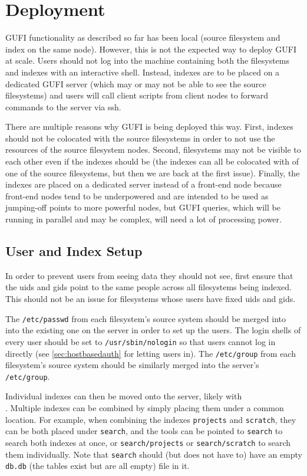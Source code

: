 \section{Deployment}
\label{sec:deploy}
GUFI functionality as described so far has been local (source
filesystem and index on the same node). However, this is not the
expected way to deploy GUFI at scale. Users should not log into the
machine containing both the filesystems and indexes with an
interactive shell. Instead, indexes are to be placed on a dedicated
GUFI server (which may or may not be able to see the source
filesystems) and users will call client scripts from client nodes to
forward commands to the server via ssh.

There are multiple reasons why GUFI is being deployed this way. First,
indexes should not be colocated with the source filesystems in order
to not use the resources of the source filesystem nodes. Second,
filesystems may not be visible to each other even if the indexes
should be (the indexes can all be colocated with of one of the source
filesystems, but then we are back at the first issue). Finally, the
indexes are placed on a dedicated server instead of a front-end node
because front-end nodes tend to be underpowered and are intended to be
used as jumping-off points to more powerful nodes, but GUFI queries,
which will be running in parallel and may be complex, will need a lot
of processing power.

\subsection{User and Index Setup}
In order to prevent users from seeing data they should not see, first
ensure that the uids and gids point to the same people across all
filesystems being indexed. This should not be an issue for filesystems
whose users have fixed uids and gids.

The \texttt{/etc/passwd} from each filesystem's source system should
be merged into into the existing one on the server in order to set up
the users. The login shells of every user should be set to
\texttt{/usr/sbin/nologin} so that users cannot log in directly (see
\ref{sec:hostbasedauth} for letting users in). The \texttt{/etc/group}
from each filesystem's source system should be similarly merged into
the server's \texttt{/etc/group}.

Individual indexes can then be moved onto the server, likely with
\\\gufitraceindex. Multiple indexes can be combined by simply placing
them under a common location. For example, when combining the indexes
\texttt{projects} and \texttt{scratch}, they can be both placed under
\texttt{search}, and the tools can be pointed to \texttt{search} to
search both indexes at once, or \texttt{search/projects} or
\texttt{search/scratch} to search them individually. Note that
\texttt{search} should (but does not have to) have an empty
\texttt{db.db} (the tables exist but are all empty) file in it.

